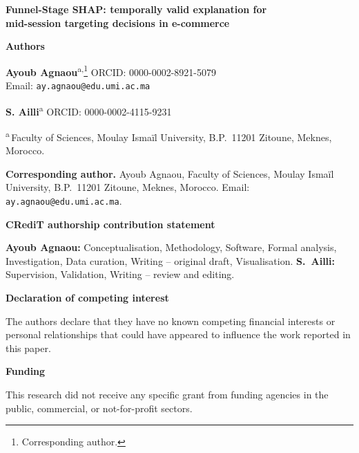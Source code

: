 \documentclass[11pt,a4paper]{article}
\begin{document}
\thispagestyle{empty}

\begin{center}
{\Large\bfseries Funnel-Stage SHAP: temporally valid explanation for\\
mid-session targeting decisions in e-commerce\par}
\end{center}

\vspace{1em}

\noindent\textbf{Authors}

\vspace{0.5em}
\noindent\textbf{Ayoub Agnaou}\textsuperscript{a,}\thanks{Corresponding author.}\quad
ORCID: 0000-0002-8921-5079\\
\noindent Email: \texttt{ay.agnaou@edu.umi.ac.ma}

\vspace{0.5em}
\noindent\textbf{S. Ailli}\textsuperscript{a}\quad
ORCID: 0000-0002-4115-9231

\vspace{1em}
\noindent\textsuperscript{a}\,Faculty of Sciences, Moulay Isma\"il University,
B.P.\ 11201 Zitoune, Meknes, Morocco.

\vspace{1em}
\noindent\textbf{Corresponding author.} Ayoub Agnaou, Faculty of Sciences,
Moulay Isma\"il University, B.P.\ 11201 Zitoune, Meknes, Morocco.
Email: \texttt{ay.agnaou@edu.umi.ac.ma}.

\vspace{2em}
\noindent\textbf{CRediT authorship contribution statement}

\vspace{0.5em}
\noindent\textbf{Ayoub Agnaou:} Conceptualisation, Methodology, Software,
Formal analysis, Investigation, Data curation, Writing -- original draft,
Visualisation. \textbf{S.~Ailli:} Supervision, Validation, Writing -- review
and editing.

\vspace{1.5em}
\noindent\textbf{Declaration of competing interest}

\vspace{0.5em}
\noindent The authors declare that they have no known competing financial
interests or personal relationships that could have appeared to influence the
work reported in this paper.

\vspace{1.5em}
\noindent\textbf{Funding}

\vspace{0.5em}
\noindent This research did not receive any specific grant from funding agencies in the public, commercial, or not-for-profit sectors.
\end{document}
